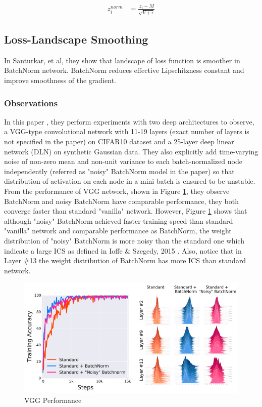 \documentclass{article}
\begin{document}
\begin{align*}
    z_i^{norm}& = \frac{z_i-M}{\sqrt{V+\epsilon}}
\end{align*}


\subsection{Loss-Landscape Smoothing} \label{landsmooth}
In Santurkar, et al, \cite{landscape} they show that landscape of loss function is smoother in BatchNorm network. BatchNorm reduces effective Lipschitzness constant and improve smoothness of the gradient.

\subsubsection{Observations}

In this paper \cite{landscape}, they perform experiments with two deep architectures to observe, a VGG-type convolutional network with 11-19 layers (exact number of layers is not specified in the paper) on CIFAR10 dataset and a 25-layer deep linear network (DLN) on synthetic Gaussian data. They also explicitly add time-varying noise of non-zero mean and non-unit variance to each batch-normalized node independently (referred as "noisy" BatchNorm model in the paper) so that distribution of activation on each node in a mini-batch is ensured to be unstable. From the performance of VGG network, shown in Figure \ref{fig:vgg}, they observe BatchNorm and noisy BatchNorm have comparable performance, they both converge faster than standard "vanilla" network. However, Figure \ref{fig:vgg} shows that although "noisy" BatchNorm achieved faster training speed than standard "vanilla" network and comparable performance as BatchNorm, the weight distribution of "noisy" BatchNorm  is more noisy than the standard one which indicate a large ICS as defined in Ioffe \& Szegedy, 2015 \cite{batchnorm}. Also, notice that in Layer \#13 the weight distribution of BatchNorm has more ICS than standard network.

\begin{figure}[h] 
	\centering
    \includegraphics[scale=0.6]{pics/batchNorm/Santurkar_fig2.jpg}
	\caption{VGG Performance}
	\label{fig:vgg}
\end{figure}
\end{document}
